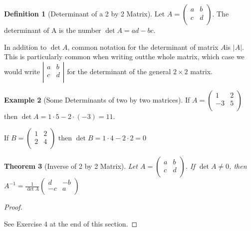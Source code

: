 \documentclass[10pt,]{book}
\theoremstyle{plain}
\newtheorem{theorem}{Theorem}[section]
\theoremstyle{definition}
\newtheorem{definition}[theorem]{Definition}
\theoremstyle{definition}
\theoremstyle{definition}
\newtheorem{example}[theorem]{Example}
\theoremstyle{definition}
\begin{document}
\begin{definition}[Determinant of a 2 by 2 Matrix]\label{determinant-2by2}
\label{notation-4}
 Let \(A =\left(
\begin{array}{cc}
 a & b \\
 c & d \\
\end{array}
\right)\). The determinant of A is the number \(\det  A = a d - b c\).%
\end{definition}
\par
In addition to \(\det  A\), common notation for the determinant of matrix \(A\)is \(\lvert A \rvert\).  This is particularly common when writing outthe whole matrix, which case we would write \(\left|
\begin{array}{cc}
 a & b \\
 c & d \\
\end{array}
\right|\) for the determinant of the general \(2 \times 2\) matrix.%
\begin{example}[Some Determinants of two by two matrices]\label{ex-some-determinants}
If \(A =\left(
\begin{array}{cc}
 1 & 2 \\
 -3 & 5 \\
\end{array}
\right)\)  then \(\det  A = 1\cdot 5 -2\cdot  (-3)=11\). 

If \(B =\left(
\begin{array}{cc}
 1 & 2 \\
 2 & 4 \\
\end{array}
\right)\)  then \(\det  B = 1\cdot 4 -2\cdot 2=0\)
%
\end{example}
\begin{theorem}[Inverse of 2 by 2 Matrix]\label{theorem-inverse-two-by-two}
 Let \(A =\left(
\begin{array}{cc}
 a & b \\
 c & d \\
\end{array}
\right)\).  If \(\det  A\neq  0\), then \(A^{-1} =\frac{1}{\det  A}\left(
\begin{array}{cc}
 d & -b \\
 -c & a \\
\end{array}
\right)\)%
\end{theorem}
\begin{proof}\hypertarget{proof-2}{}
See Exercise 4 at the end of this section.%
\end{proof}
\end{document}
